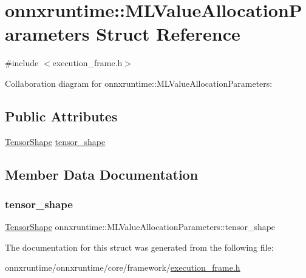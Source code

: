 \hypertarget{structonnxruntime_1_1MLValueAllocationParameters}{}\section{onnxruntime\+:\+:M\+L\+Value\+Allocation\+Parameters Struct Reference}
\label{structonnxruntime_1_1MLValueAllocationParameters}


{\ttfamily \#include $<$execution\+\_\+frame.\+h$>$}



Collaboration diagram for onnxruntime\+:\+:M\+L\+Value\+Allocation\+Parameters\+:
\subsection*{Public Attributes}
\begin{DoxyCompactItemize}
\item 
\mbox{\hyperlink{classonnxruntime_1_1TensorShape}{Tensor\+Shape}} \mbox{\hyperlink{structonnxruntime_1_1MLValueAllocationParameters_a16cded2f48f3260a39bdc60c3a9ed7e6}{tensor\+\_\+shape}}
\end{DoxyCompactItemize}


\subsection{Member Data Documentation}
\mbox{\label{structonnxruntime_1_1MLValueAllocationParameters_a16cded2f48f3260a39bdc60c3a9ed7e6}} 
\subsubsection{\texorpdfstring{tensor\+\_\+shape}{tensor\_shape}}
{\footnotesize\ttfamily \mbox{\hyperlink{classonnxruntime_1_1TensorShape}{Tensor\+Shape}} onnxruntime\+::\+M\+L\+Value\+Allocation\+Parameters\+::tensor\+\_\+shape}



The documentation for this struct was generated from the following file\+:\begin{DoxyCompactItemize}
\item 
onnxruntime/onnxruntime/core/framework/\mbox{\hyperlink{execution__frame_8h}{execution\+\_\+frame.\+h}}\end{DoxyCompactItemize}
